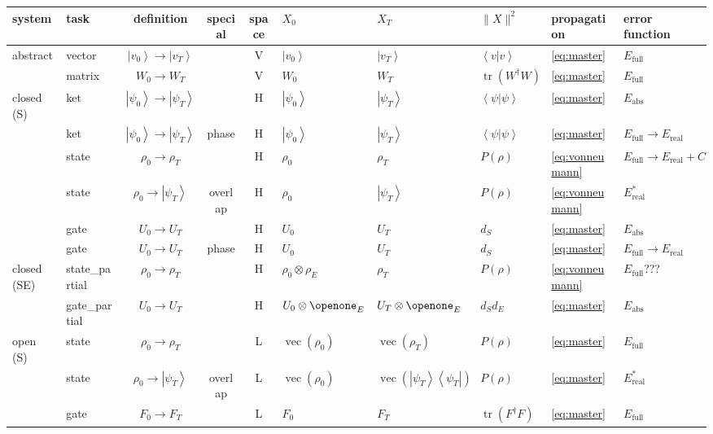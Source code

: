 \documentclass[aps, pra, a4paper, longbibliography, superscriptaddress]{revtex4-1}
\newcommand{\I}{\openone}
\newcommand{\ket}[1]{\left| #1 \right \rangle}
\newcommand{\braket}[2]{\left \langle #1 | #2 \right \rangle}
\newcommand{\ketbra}[2]{\left| #1 \right \rangle \left \langle #2 \right|}
\DeclareMathOperator{\tr}{tr}
\DeclareMathOperator{\cvec}{vec}
\newcommand{\Xt}{X_T}  %
\newcommand{\Xo}{X_0}  %
\begin{document}
\begin{table}
\begin{tabular}{ll|c|c|c|l|l|l|l|l}
system & task & definition & special & space & $\Xo$ & $\Xt$ & $\|X\|^2$ & propagation & error function\\
\hline
abstract
& vector & $\ket{v_0} \to \ket{v_T}$ && V
& $\ket{v_0}$ &$\ket{v_T}$ & $\braket{v}{v}$ &
\eqref{eq:master} & $E_\text{full}$\\
& matrix & $W_0 \to W_T$ && V
& $W_0$ & $W_T$ & $\tr(W^\dagger W)$ &
\eqref{eq:master} & $E_\text{full}$\\
\hline
closed (S)
& ket & $\ket{\psi_0} \to \ket{\psi_T}$ && H
& $\ket{\psi_0}$ & $\ket{\psi_T}$ & $\braket{\psi}{\psi}$ &
\eqref{eq:master} & $E_\text{abs}$\\
& ket & $\ket{\psi_0} \to \ket{\psi_T}$ & phase & H
& $\ket{\psi_0}$ & $\ket{\psi_T}$ & $\braket{\psi}{\psi}$ &
\eqref{eq:master} & $E_\text{full} \to E_\text{real}$\\
& state & $\rho_0 \to \rho_T$ && H
& $\rho_0$ & $\rho_T$ & $P(\rho)$ &
\eqref{eq:vonneumann} & $E_\text{full} \to E_\text{real} + C$\\
& state & $\rho_0 \to \ket{\psi_T}$ & overlap & H
& $\rho_0$ & $\ket{\psi_T}$ & $P(\rho)$ &
\eqref{eq:vonneumann} & $E_\text{real}^*$\\
& gate & $U_0 \to U_T$ && H
& $U_0$ & $U_T$ & $d_S$ &
\eqref{eq:master} & $E_\text{abs}$\\
& gate & $U_0 \to U_T$ & phase & H
& $U_0$ & $U_T$ & $d_S$ &
\eqref{eq:master} & $E_\text{full} \to E_\text{real}$\\
\hline
closed (SE)
& state\_partial & $\rho_0 \to \rho_T$ && H
& $\rho_0 \otimes \rho_E$ & $\rho_T$ & $P(\rho)$ &
\eqref{eq:vonneumann} & $E_\text{full}$???\\
& gate\_partial & $U_0 \to U_T$ && H
& $U_0 \otimes \I_E$ & $U_T \otimes \I_E$ & $d_S d_E$ &
\eqref{eq:master} & $E_\text{abs}$\\
\hline
open (S)
& state & $\rho_0 \to \rho_T$ && L & $\cvec(\rho_0)$ & $\cvec(\rho_T)$ & $P(\rho)$ &
\eqref{eq:master} & $E_\text{full}$\\
& state & $\rho_0 \to \ket{\psi_T}$ & overlap & L
& $\cvec(\rho_0)$ & $\cvec(\ketbra{\psi_T}{\psi_T})$ & $P(\rho)$ &
\eqref{eq:master} & $E_\text{real}^*$\\
& gate & $F_0 \to F_T$ && L & $F_0$ & $F_T$ & $\tr(F^\dagger F)$ &
\eqref{eq:master} & $E_\text{full}$\\

\end{tabular}
\end{table}
\end{document}
